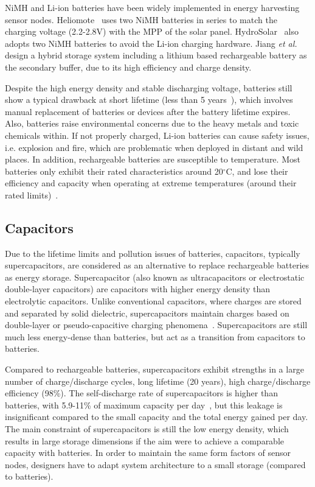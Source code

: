 NiMH and Li-ion batteries have been widely implemented in energy harvesting sensor nodes. Heliomote~\cite{raghunathan2005design} uses two NiMH batteries in series to match the charging voltage (2.2-2.8V) with the MPP of the solar panel. HydroSolar~\cite{taneja2008design} also adopts two NiMH batteries to avoid the Li-ion charging hardware. Jiang \textit{et al.}~\cite{jiang2005perpetual} design a hybrid storage system including a lithium based rechargeable battery as the secondary buffer, due to its high efficiency and charge density.

Despite the high energy density and stable discharging voltage, batteries still show a typical drawback at short lifetime (less than 5 years~\cite{simjee2008efficient}), which involves manual replacement of batteries or devices after the battery lifetime expires. Also, batteries raise environmental concerns due to the heavy metals and toxic chemicals within. If not properly charged, Li-ion batteries can cause safety issues, i.e. explosion and fire, which are problematic when deployed in distant and wild places. In addition, rechargeable batteries are susceptible to temperature. Most batteries only exhibit their rated characteristics around 20$^\circ$C, and lose their efficiency and capacity when operating at extreme temperatures (around their rated limits)~\cite{prauzek2018energy}. 


\subsection{Capacitors}

Due to the lifetime limits and pollution issues of batteries, capacitors, typically supercapacitors, are considered as an alternative to replace rechargeable batteries as energy storage. Supercapacitor (also known as ultracapacitors or electrostatic double-layer capacitors) are capacitors with higher energy density than electrolytic capacitors. Unlike conventional capacitors, where charges are stored and separated by solid dielectric, supercapacitors maintain charges based on double-layer or pseudo-capacitive charging phenomena~\cite{bueno2019nanoscale}. Supercapacitors are still much less energy-dense than batteries, but act as a transition from capacitors to batteries. 

Compared to rechargeable batteries, supercapacitors exhibit strengths in a large number of charge/discharge cycles, long lifetime (20 years), high charge/discharge efficiency (98\%). The self-discharge rate of supercapacitors is higher than batteries, with 5.9-11\% of maximum capacity per day~\cite{libich2018supercapacitors, renner2009lifetime}, but this leakage is insignificant compared to the small capacity and the total energy gained per day. The main constraint of supercapacitors is still the low energy density, which results in large storage dimensions if the aim were to achieve a comparable capacity with batteries. In order to maintain the same form factors of sensor nodes, designers have to adapt system architecture to a small storage (compared to batteries).

